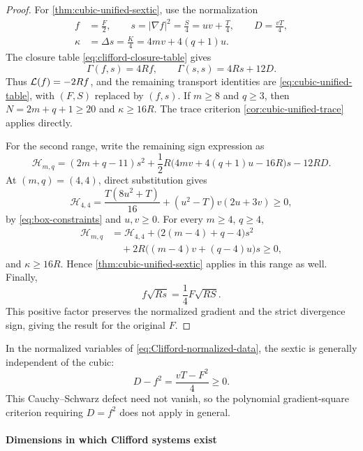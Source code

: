 \begin{proof}
For \cref{thm:cubic-unified-sextic}, use the normalization
\begin{equation}\label{eq:Clifford-normalized-data}
 \begin{aligned}
 f&=\frac F2,\qquad s=|\nabla f|^2=\frac S4=uv+\frac T4,
 \qquad D=\frac{vT}{4},\\
 \kappa&=\Delta s=\frac K4=4mv+4(q+1)u.
 \end{aligned}
\end{equation}
The closure table \eqref{eq:clifford-closure-table} gives
\begin{equation}\label{eq:Clifford-unified-table}
 \Gamma(f,s)=4Rf,\qquad \Gamma(s,s)=4Rs+12D.
\end{equation}
Thus \(\mathcal L(f)=-2Rf\), and the remaining transport identities are
\eqref{eq:cubic-unified-table}, with \((F,S)\) replaced by \((f,s)\).
If \(m\geq8\) and \(q\geq3\), then
\(N=2m+q+1\geq20\) and \(\kappa\geq16R\).
The trace criterion \cref{cor:cubic-unified-trace} applies directly.

For the second range, write the remaining sign expression as
\[
 \mathscr H_{m,q}
 =(2m+q-11)s^2+\frac12R\bigl(4mv+4(q+1)u-16R\bigr)s-12RD.
\]
At \((m,q)=(4,4)\), direct substitution gives
\begin{equation}\label{eq:Clifford-H44}
 \mathscr H_{4,4}
 =\frac{T(8u^2+T)}{16}+(u^2-T)v(2u+3v)\geq0,
\end{equation}
by \eqref{eq:box-constraints} and \(u,v\geq0\).
For every \(m\geq4\), \(q\geq4\),
\begin{align*}
 \mathscr H_{m,q}
 &=\mathscr H_{4,4}
   +\bigl(2(m-4)+q-4\bigr)s^2\\
 &\quad+2R\bigl((m-4)v+(q-4)u\bigr)s\geq0,
\end{align*}
and \(\kappa\geq16R\). Hence \cref{thm:cubic-unified-sextic}
applies in this range as well.
Finally,
\[
 f\sqrt{Rs}=\frac14F\sqrt{RS}.
\]
This positive factor preserves the normalized gradient and the
strict divergence sign, giving the result for the original \(F\).
\end{proof}

In the normalized variables of \eqref{eq:Clifford-normalized-data},
the sextic is generally independent of the cubic:
\[
 D-f^2=\frac{vT-F^2}{4}\geq0.
\]
This Cauchy--Schwarz defect need not vanish, so the polynomial
gradient-square criterion requiring \(D=f^2\) does not apply in general.

\paragraph*{Dimensions in which Clifford systems exist}

